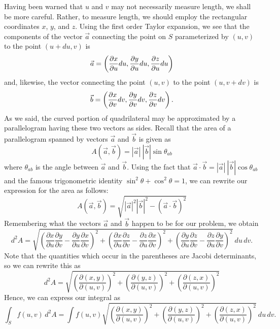\documentclass[12pt]{article}
\begin{document}
Having been warned that $u$ and $v$ may not necessarily measure length, we shall be more careful.  Rather, to measure length, we should employ the rectangular coordinates $x$, $y$, and $z$.  Using the first order Taylor expansion, we see that the components of the vector ${\vec a}$ connecting the point on $S$ parameterized by $(u,v)$ to the point $(u + du, v)$ is
 $${\vec a} = \left( {\partial x \over \partial u} du, {\partial y \over \partial u} du, {\partial z \over \partial u} du \right)$$
and, likewise, the vector connecting the point $(u,v)$ to the point $(u, v + dv)$ is
 $${\vec b} = \left( {\partial x \over \partial v} dv, {\partial y \over \partial v} dv, {\partial z \over \partial v} dv \right).$$
As we said, the curved portion of quadrilateral may be approximated by a parallelogram having these two vectors as sides.  Recall that the area of a parallelogram spanned by vectors ${\vec a}$ and ${\vec b}$ is given as
 $$A ({\vec a}, {\vec b}) = |{\vec a}| \> |{\vec b}| \sin \theta_{ab}$$
where $\theta_{ab}$ is the angle between ${\vec a}$ and ${\vec b}$.  Using the fact that ${\vec a} \cdot {\vec b} = |{\vec a}| \> |{\vec b}| \cos \theta_{ab}$ and the famous trigonometric identity $\sin^2 \theta + \cos^2 \theta = 1$, we can rewrite our expression for the area as follows:
 $$A ({\vec a}, {\vec b}) = \sqrt{ |{\vec a}|^2 |{\vec b}|^2 - \left( {\vec a} \cdot {\vec b} \right)^2 }$$
Remembering what the vectors ${\vec a}$ and ${\vec b}$ happen to be for our problem, we obtain 
 $$d^2 A = \sqrt{ \left( \frac{\partial x}{\partial u} \frac{\partial y}{\partial v} - \frac{\partial y}{\partial u} \frac{\partial x}{\partial v} \right)^2 + \left( \frac{\partial x}{\partial u} \frac{\partial z}{\partial v} - \frac{\partial z}{\partial u} \frac{\partial x}{\partial v} \right)^2 + \left( \frac{\partial y}{\partial u} \frac{\partial z}{\partial v} - \frac{\partial z}{\partial u} \frac{\partial y}{\partial v} \right)^2} \> du \, dv.$$
Note that the quantities which occur in the parentheses are Jacobi determinants, so we can rewrite this as
  $$d^2 A = \sqrt{ \left(  \frac{\partial (x,y)}{\partial (u,v)} \right)^2 +  \left( \frac{\partial (y,z)}{\partial (u,v)} \right)^2 + \left( \frac{\partial (z,x)}{\partial (u,v)} \right)^2 }$$
Hence, we can express our integral as
 $$\int_S f(u,v) \, d^2 A = \int f(u,v) \sqrt{ \left(  \frac{\partial (x,y)}{\partial (u,v)} \right)^2 +  \left( \frac{\partial (y,z)}{\partial (u,v)} \right)^2 + \left( \frac{\partial (z,x)}{\partial (u,v)} \right)^2 } \> du \, dv.$$
\end{document}
